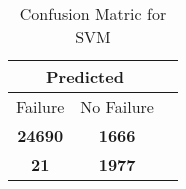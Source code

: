 \begin{table}[] 
\caption{Confusion Matric for SVM} 
\label{Table: Prediction Accuracy-NoneSVM80.0EKF-ignoreReflection-Reflection} 
\centering 
\begin{tabular} 
 {@{}ccc@{}} 
\toprule 
\multicolumn{2}{c}{\textbf{Predicted}}
 \\ \midrule 
\multicolumn{1}{|c|}{Failure} & 
\multicolumn{1}{c|}{No Failure}
 \\ \midrule 
\multicolumn{1}{|c|}{\color{green}\textbf{24690}} & 
\multicolumn{1}{c|}{\color{red}\textbf{1666}}
 \\ \midrule 
\multicolumn{1}{|c|}{\color{red}\textbf{21}} & 
\multicolumn{1}{c|}{\color{green}\textbf{1977}}
 \\ \bottomrule 
\end{tabular} 
\end{table} 

